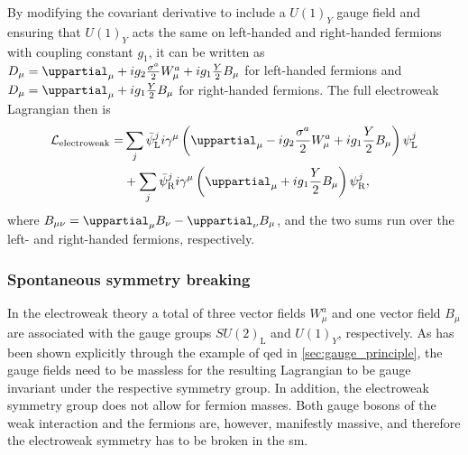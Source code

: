 By modifying the covariant derivative to include a $U(1)_Y$ gauge field and ensuring that $U(1)_Y$ acts the same on left-handed and right-handed fermions with coupling constant $g_1$, it can be written as $\codiff_\mu = \uppartial_\mu + ig_2\frac{\sigma^a}{2}W^a_\mu + ig_1\frac{Y}{2}B_\mu$ for left-handed fermions and $\codiff_\mu = \uppartial_\mu + ig_1\frac{Y}{2}B_\mu$ for right-handed fermions. The full electroweak Lagrangian then is
\begin{equation}
\begin{split}
	\Lagr_\mathrm{electroweak} = & \sum_j{\bar{\psi}_\mathrm{L}^j i \gamma^\mu \left(\uppartial_\mu -ig_2\frac{\sigma^a}{2} W^a_\mu + ig_1 \frac{Y}{2} B_\mu \right) \psi^j_\mathrm{L}} \\
	& + \sum_j{\bar{\psi}_\mathrm{R}^j i \gamma^\mu \left(\uppartial_\mu + ig_1 \frac{Y}{2} B_\mu \right) \psi^j_\mathrm{R}}, 
\end{split}
\end{equation}
where $B_{\mu\nu} = \uppartial_\mu B_\nu - \uppartial_\nu B_\mu$, and the two sums run over the left- and right-handed fermions, respectively.

\subsubsection{Spontaneous symmetry breaking}
\label{sec:ssb}

In the electroweak theory a total of three vector fields $W^a_\mu$ and one vector field $B_\mu$ are associated with the gauge groups $SU(2)_\mathrm{L}$ and $U(1)_Y$, respectively. As has been shown explicitly through the example of \gls{qed} in \cref{sec:gauge_principle}, the gauge fields need to be massless for the resulting Lagrangian to be gauge invariant under the respective symmetry group. In addition, the electroweak symmetry group does not allow for fermion masses. Both gauge bosons of the weak interaction and the fermions are, however, manifestly massive, and therefore the electroweak symmetry has to be broken in the \gls{sm}.

